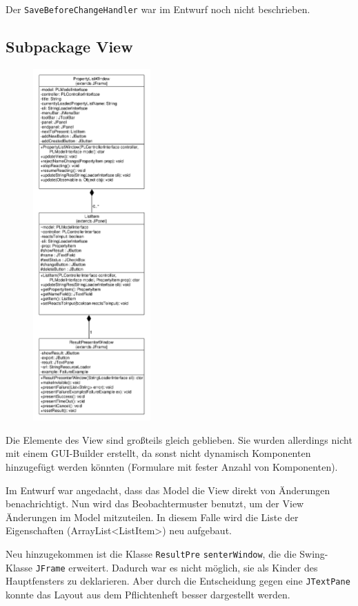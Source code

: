 \documentclass[a4paper]{scrreprt}
\begin{document}
Der \verb!SaveBeforeChangeHandler! war im Entwurf noch nicht beschrieben.

\newpage
\subsection{Subpackage View}

\begin{figure}
\includegraphics[width=0.4\textwidth]{PropertyListView.pdf}
\end{figure}

Die Elemente des View sind großteils gleich geblieben. Sie wurden allerdings nicht mit einem GUI-Builder erstellt, da sonst nicht dynamisch Komponenten hinzugefügt werden könnten (Formulare mit fester Anzahl von Komponenten).

Im Entwurf war angedacht, dass das Model die View direkt von Änderungen benachrichtigt. Nun wird das Beobachtermuster benutzt, um der View Änderungen im Model mitzuteilen. In diesem Falle wird die Liste der Eigenschaften (ArrayList<ListItem>) neu aufgebaut.

Neu hinzugekommen ist die Klasse \verb!ResultPre! \verb!senterWindow!, die die Swing-Klasse \verb!JFrame! erweitert. Dadurch war es nicht möglich, sie als Kinder des Hauptfensters zu deklarieren. Aber durch die Entscheidung gegen eine \verb!JTextPane! konnte das Layout aus dem Pflichtenheft besser dargestellt werden.
\end{document}
